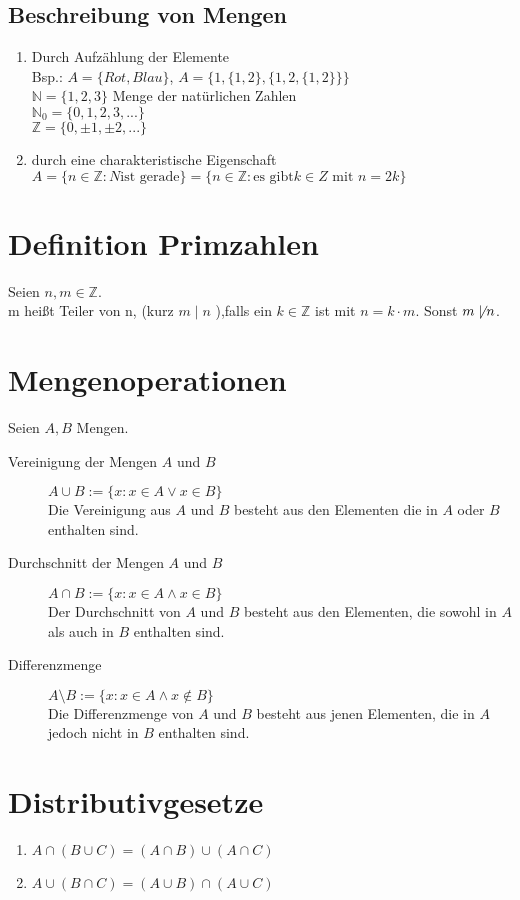 \subsection{Beschreibung von Mengen}
\begin{enumerate}
\item Durch Aufzählung der Elemente\\
Bsp.: $A = \{Rot, Blau\}$, $A = \{1, \{1, 2\}, \{1, 2,\{1, 2\} \}\}$\\
$\mathbb{N} = \{1, 2, 3\}$ Menge der natürlichen Zahlen\\
$\mathbb{N}_0 = \{0, 1, 2, 3,...\}$\\
$\mathbb{Z} = \{0, \pm 1, \pm 2,...\}$
\item durch eine charakteristische Eigenschaft\\
$A = \{n \in \mathbb{Z}: N \text{ist gerade}\} = \{n \in \mathbb{Z}: \text{es gibt} k \in Z \text{ mit } n = 2k\}$
\end{enumerate}
\section{Definition Primzahlen}
Seien $n, m \in \mathbb{Z}$.\\
m heißt Teiler von n, (kurz $m\mid n$ ),falls ein $k \in \mathbb{Z}$ ist mit $n = k \cdot m$. Sonst $m \not\mid n$.
\section{Mengenoperationen}
Seien $A, B$ Mengen.
\begin{description}
\item[Vereinigung der Mengen $A$ und $B$]{$A \cup B := \{x: x \in A \vee x\in B\}$\\
Die Vereinigung aus $A$ und $B$ besteht aus den Elementen die in $A$ oder $B$ enthalten sind.}
\item[Durchschnitt der Mengen $A$ und $B$] {$A \cap B := \{x: x \in A \wedge x \in B\}$\\
Der Durchschnitt von $A$ und $B$ besteht aus den Elementen, die sowohl in $A$ als auch in $B$ enthalten sind.}
\item[Differenzmenge]{$A \setminus B := \{x: x \in A \wedge x \notin B\}$\\
Die Differenzmenge von $A$ und $B$ besteht aus jenen Elementen, die in $A$ jedoch nicht in $B$ enthalten sind.}
\end{description}
\section{Distributivgesetze}
\begin{enumerate}
\item $A \cap (B \cup C) = (A \cap B) \cup (A \cap C)$
\item $A \cup (B \cap C) = (A \cup B) \cap (A \cup C)$
\end{enumerate}
